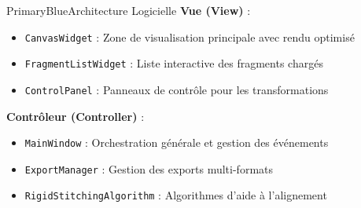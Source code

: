 \documentclass[11pt,a4paper]{article}
\begin{document}
\begin{sectionbox}{PrimaryBlue}{Architecture Logicielle}
\textbf{Vue (View)} :
\begin{itemize}[leftmargin=*]
    \item \texttt{CanvasWidget} : Zone de visualisation principale avec rendu optimisé
    \item \texttt{FragmentListWidget} : Liste interactive des fragments chargés
    \item \texttt{ControlPanel} : Panneaux de contrôle pour les transformations
\end{itemize}

\textbf{Contrôleur (Controller)} :
\begin{itemize}[leftmargin=*]
    \item \texttt{MainWindow} : Orchestration générale et gestion des événements
    \item \texttt{ExportManager} : Gestion des exports multi-formats
    \item \texttt{RigidStitchingAlgorithm} : Algorithmes d'aide à l'alignement
\end{itemize}

\end{sectionbox}
\end{document}
